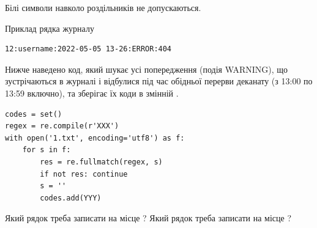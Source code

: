 \documentclass[12pt, ukrainian]{article}
\begin{document}
{Білі символи навколо роздільників не допускаються.

Приклад рядка журналу



\begin{verbatim}
12:username:2022-05-05 13-26:ERROR:404
\end{verbatim}


Нижче наведено код, який шукає усі попередження (подія WARNING), що зустрі\-ча\-ються в журналі і відбулися під час обідньої перерви деканату (з 13:00 по 13:59 включно), та зберігає їх коди в змінній .



\begin{verbatim}
codes = set()
regex = re.compile(r'XXX')
with open('1.txt', encoding='utf8') as f:
    for s in f:
        res = re.fullmatch(regex, s)
        if not res: continue
        s = ''
        codes.add(YYY)
\end{verbatim}





Який рядок треба записати на місце  ?
Який рядок треба записати на місце  ?\par

}
\end{document}
